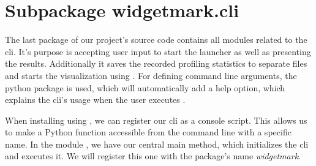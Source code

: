 \section{Subpackage widgetmark.cli}

The last package of our project's source code contains all modules related to
the \gls{cli}. It's purpose is accepting user input to start the launcher as
well as presenting the results. Additionally it saves the recorded profiling
statistics to separate files and starts the visualization using
. For defining command line arguments, the python
package  is used, which will automatically add a
help option, which explains the \gls{cli}'s usage when the user executes
.

When installing  using
, we can register our \gls{cli} as a console
script. This allows us to make a Python function accessible from the command
line with a specific name. In the module , we have
our central main method, which initializes the \gls{cli} and executes it. We
will register this one with the package's name \emph{widgetmark}.






